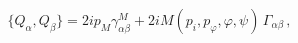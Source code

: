 \begin{equation}\label{susya}
\{Q_\alpha,Q_\beta\}=2ip_M\gamma^M_{\alpha\beta}
+2iM(p_i,p_{\varphi},\varphi,\psi)\,\Gamma_{\alpha\beta}\,,
\end{equation}

